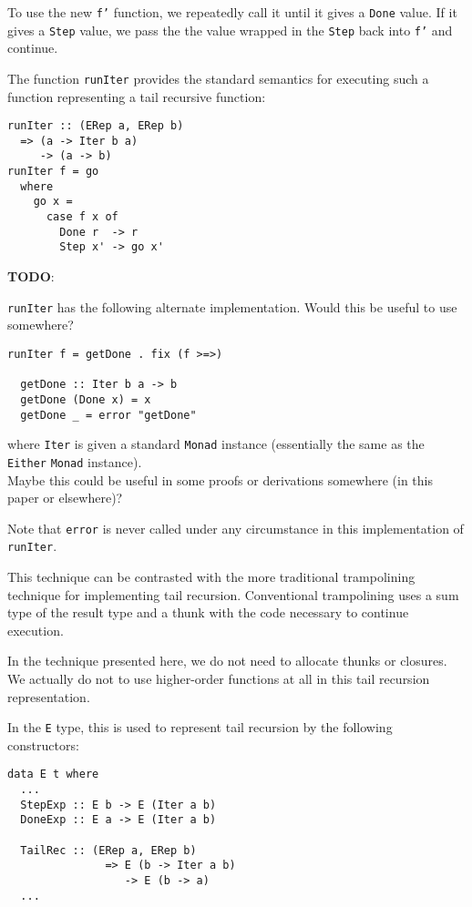 \documentclass[sigplan,anonymous,review]{acmart}
\newcommand{\ttt}{\texttt}
\newenvironment{todo}
  {\begin{tcolorbox}
   \textbf{TODO}:
  }
  {\end{tcolorbox}
  }
\begin{document}
To use the new \ttt{f'} function, we repeatedly call it until it gives a
\ttt{Done} value. If it gives a \ttt{Step} value, we pass the the value wrapped
in the \ttt{Step} back into \ttt{f'} and continue.

The function \ttt{runIter} provides the standard semantics for executing such a
function representing a tail recursive function:

\begin{lstlisting}
runIter :: (ERep a, ERep b)
  => (a -> Iter b a)
     -> (a -> b)
runIter f = go
  where
    go x =
      case f x of
        Done r  -> r
        Step x' -> go x'
\end{lstlisting}

\begin{todo}
  \ttt{runIter} has the following alternate implementation. Would this be
  useful to use somewhere?

  \begin{lstlisting}[otherkeywords={}]
  runIter f = getDone . fix (f >=>)

  getDone :: Iter b a -> b
  getDone (Done x) = x
  getDone _ = error "getDone"
  \end{lstlisting}

  where \verb|Iter| is given a standard \verb|Monad| instance (essentially the
  same as the \verb|Either| \verb|Monad| instance). \\


  Maybe this could be useful in some proofs or derivations somewhere (in this
  paper or elsewhere)?

  Note that \verb|error| is never called under any circumstance in this
  implementation of \verb|runIter|.
\end{todo}

This technique can be contrasted with the more traditional trampolining
technique for implementing tail recursion. Conventional trampolining uses a
sum type of the result type and a thunk with the code necessary to continue
execution.~\cite{Ganz:99:Trampolined}

In the technique presented here, we do not need to allocate thunks or closures.
We actually do not to use higher-order functions at all in this tail recursion
representation.

In the \ttt{E} type, this is used to represent tail recursion by
the following constructors:

\begin{lstlisting}
data E t where
  ...
  StepExp :: E b -> E (Iter a b)
  DoneExp :: E a -> E (Iter a b)

  TailRec :: (ERep a, ERep b)
               => E (b -> Iter a b)
                  -> E (b -> a)
  ...
\end{lstlisting}
\end{document}
